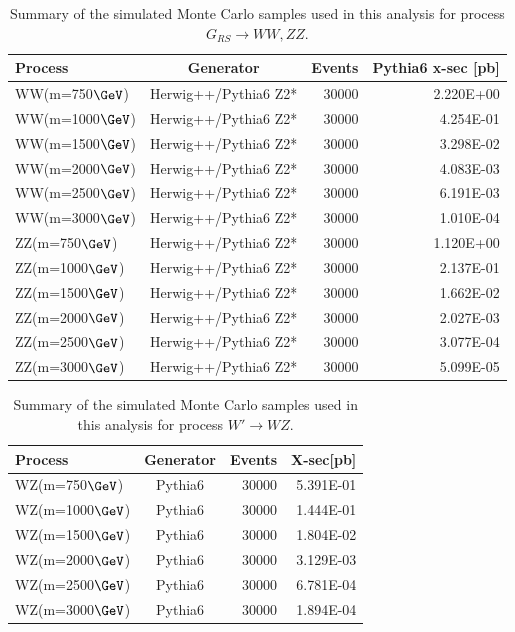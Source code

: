 \begin{table}[htb]
\begin{center}
\begin{tabular}{ |l|c|r|r| }
\hline
Process            & Generator             & Events& Pythia6 x-sec [pb] \\
\hline
WW(m=750$\GeVcc$)  &Herwig++/Pythia6 Z2*   &30000  & 2.220E+00\\
WW(m=1000$\GeVcc$) &Herwig++/Pythia6 Z2*   &30000  & 4.254E-01 \\
WW(m=1500$\GeVcc$) &Herwig++/Pythia6 Z2*   &30000  & 3.298E-02 \\
WW(m=2000$\GeVcc$) &Herwig++/Pythia6 Z2*   &30000  & 4.083E-03 \\
WW(m=2500$\GeVcc$) &Herwig++/Pythia6 Z2*   &30000  & 6.191E-03 \\
WW(m=3000$\GeVcc$) &Herwig++/Pythia6 Z2*   &30000  & 1.010E-04 \\
ZZ(m=750$\GeVcc$)  &Herwig++/Pythia6 Z2*   &30000  & 1.120E+00 \\
ZZ(m=1000$\GeVcc$) &Herwig++/Pythia6 Z2*   &30000  & 2.137E-01 \\
ZZ(m=1500$\GeVcc$) &Herwig++/Pythia6 Z2*   &30000  & 1.662E-02 \\
ZZ(m=2000$\GeVcc$) &Herwig++/Pythia6 Z2*   &30000  & 2.027E-03 \\
ZZ(m=2500$\GeVcc$) &Herwig++/Pythia6 Z2*   &30000  & 3.077E-04 \\
ZZ(m=3000$\GeVcc$) &Herwig++/Pythia6 Z2*   &30000  & 5.099E-05 \\
\hline
\end{tabular}
\end{center}
\caption{Summary of the simulated Monte Carlo samples used in this analysis for process
 $G_{RS} \to WW, ZZ$.}
\label{table:doubletag}
\end{table}

\begin{table}[htb]
\begin{center}
\begin{tabular}{ |l|c|r|r| }
\hline
Process           & Generator& Events & X-sec[pb] \\
\hline
WZ(m=750$\GeVcc$) &Pythia6   &30000   &5.391E-01  \\
WZ(m=1000$\GeVcc$)&Pythia6   &30000   &1.444E-01 \\
WZ(m=1500$\GeVcc$)&Pythia6   &30000   &1.804E-02  \\
WZ(m=2000$\GeVcc$)&Pythia6   &30000   &3.129E-03  \\
WZ(m=2500$\GeVcc$)&Pythia6   &30000   &6.781E-04  \\
WZ(m=3000$\GeVcc$)&Pythia6   &30000   &1.894E-04  \\
\hline
\end{tabular}
\end{center}
\caption{Summary of the simulated Monte Carlo samples used in this analysis for process
 $W' \to WZ$.}
\label{table:doubletag2}
\end{table}


